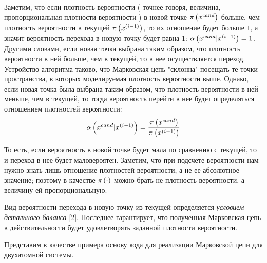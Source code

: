 Заметим, что если плотность вероятности ( точнее говоря, величина, пропорциональная плотности вероятности ) в новой точке $\pi \left( x^{cand} \right)$ больше, чем плотность вероятности в текущей $\pi \left( x^{\left( i - 1 \right)} \right)$, то их отношение будет больше $1$, а значит вероятность перехода в новую точку будет равна 1: $\alpha \left( x^{cand} | x^{(i - 1)} \right) = 1$. Другими словами, если новая точка выбрана таким образом, что плотность вероятности в ней больше, чем в текущей, то в нее осуществляется переход. Устройство алгоритма таково, что Марковская цепь "склонна" посещать те точки пространства, в которых моделируемая плотность вероятности выше. Однако, если новая точка была выбрана таким образом, что плотность вероятности в ней меньше, чем в текущей, то тогда вероятность перейти в нее будет определяться отношением плотностей вероятности:
\begin{gather}
		\alpha \left( x^{cand} | x^{(i - 1)} \right) = \frac{\pi \left( x^{cand} \right)}{\pi \left( x^{(i - 1)} \right)} \notag
\end{gather}

То есть, если вероятность в новой точке будет мала по сравнению с текущей, то и переход в нее будет маловероятен. Заметим, что при подсчете вероятности нам нужно знать лишь отношение плотностей вероятности, а не ее абсолютное значение; поэтому в качестве $\pi \left( \cdot \right)$ можно брать не плотность вероятности, а величину ей пропорциональную. \par
Вид вероятности перехода в новую точку из текущей определяется \textit{условием детального баланса} [2]. Последнее гарантирует, что полученная Марковская цепь в действительности будет удовлетворять заданной плотности вероятности. \par
Представим в качестве примера основу кода для реализации Марковской цепи для двухатомной системы.

